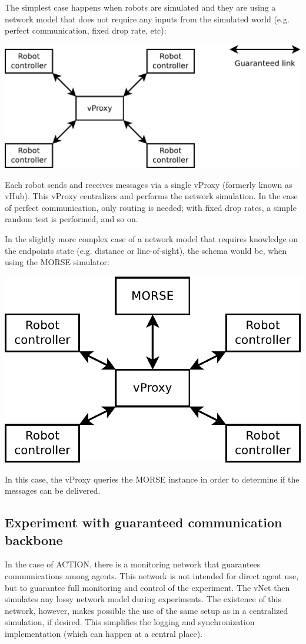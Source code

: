 \documentclass[a4paper,11pt]{article}
\begin{document}
The simplest case happens when robots are simulated and they are using a network model that does not require any inputs from the simulated world (e.g. perfect communication, fixed drop rate, etc):

\begin{center}
\includegraphics[width=0.666\columnwidth]{figures/central}
\end{center}

Each robot sends and receives messages via a single vProxy (formerly known as vHub). This vProxy centralizes and performs the network simulation. In the case of perfect communication, only routing is needed; with fixed drop rates, a simple random test is performed, and so on.

In the slightly more complex case of a network model that requires knowledge on the endpoints state (e.g. distance or line-of-sight), the schema would be, when using the MORSE simulator:

\begin{center}
\includegraphics[width=0.666\columnwidth]{figures/central+morse}
\end{center}

In this case, the vProxy queries the MORSE instance in order to determine if the messages can be delivered.

\subsection{Experiment with guaranteed communication backbone}

In the case of ACTION, there is a monitoring network that guarantees communications among agents. This network is not intended for direct agent use, but to guarantee full monitoring and control of the experiment. The vNet then simulates any lossy network model during experiments. The existence of this network, however, makes possible the use of the same setup as in a centralized simulation, if desired. This simplifies the logging and synchronization implementation (which can happen at a central place).
\end{document}

